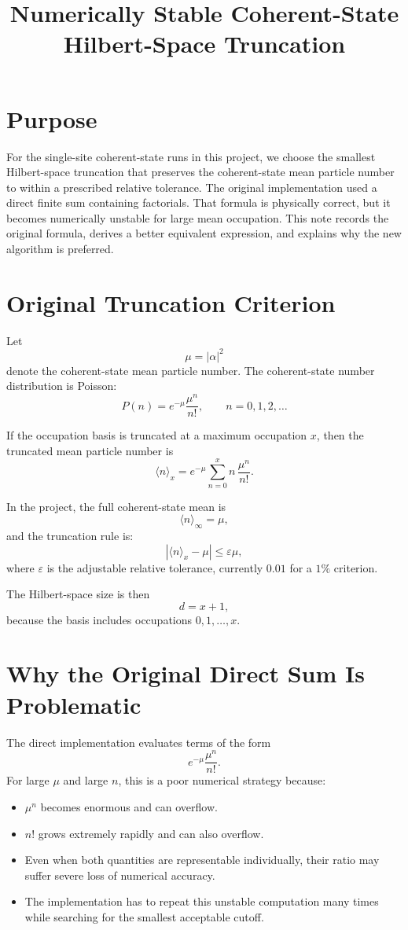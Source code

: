 \documentclass[12pt]{article}
\title{Numerically Stable Coherent-State Hilbert-Space Truncation}
\author{}
\date{}
\begin{document}
\maketitle

\section*{Purpose}
For the single-site coherent-state runs in this project, we choose the smallest Hilbert-space truncation that preserves the coherent-state mean particle number to within a prescribed relative tolerance. The original implementation used a direct finite sum containing factorials. That formula is physically correct, but it becomes numerically unstable for large mean occupation. This note records the original formula, derives a better equivalent expression, and explains why the new algorithm is preferred.

\section*{Original Truncation Criterion}
Let
\[
\mu = |\alpha|^2
\]
denote the coherent-state mean particle number. The coherent-state number distribution is Poisson:
\[
P(n) = e^{-\mu}\frac{\mu^n}{n!}, \qquad n=0,1,2,\dots
\]

If the occupation basis is truncated at a maximum occupation $x$, then the truncated mean particle number is
\[
\langle n \rangle_x
= e^{-\mu}\sum_{n=0}^{x} n\,\frac{\mu^n}{n!}.
\]

In the project, the full coherent-state mean is
\[
\langle n \rangle_\infty = \mu,
\]
and the truncation rule is:
\[
\left|\langle n \rangle_x - \mu\right| \le \varepsilon \mu,
\]
where $\varepsilon$ is the adjustable relative tolerance, currently $0.01$ for a $1\%$ criterion.

The Hilbert-space size is then
\[
d = x+1,
\]
because the basis includes occupations $0,1,\dots,x$.

\section*{Why the Original Direct Sum Is Problematic}
The direct implementation evaluates terms of the form
\[
e^{-\mu}\frac{\mu^n}{n!}.
\]
For large $\mu$ and large $n$, this is a poor numerical strategy because:
\begin{itemize}
\item $\mu^n$ becomes enormous and can overflow.
\item $n!$ grows extremely rapidly and can also overflow.
\item Even when both quantities are representable individually, their ratio may suffer severe loss of numerical accuracy.
\item The implementation has to repeat this unstable computation many times while searching for the smallest acceptable cutoff.
\end{itemize}
\end{document}
